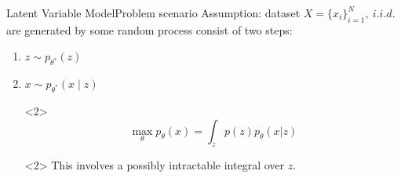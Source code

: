 \documentclass{beamer}
\begin{document}
\begin{frame}{Latent Variable Model}{Problem scenario}
Assumption: dataset $X = \{x_i\}^N_{i=1},~i.i.d.$ %
are generated by some random process consist of two steps:
\begin{enumerate}
    \item<1-> $z\sim p_{\theta^\ast}(z)$
    \item<1-> $x\sim p_{\theta^\ast}(x\mid z)$

    \item[]<2> $$\max\limits_{\theta} p_{\theta}(x)=\int_z p(z)p_{\theta}(x|z)$$
    \item[]<2> This involves a possibly \textcolor{DeepPink3}{intractable} integral over $z$.
\end{enumerate}
\end{frame}
\end{document}
